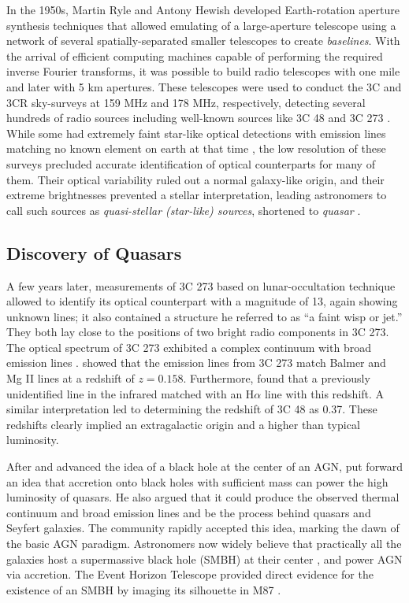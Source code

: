 In the 1950s, Martin Ryle and Antony Hewish developed Earth-rotation aperture synthesis techniques that allowed emulating of a large-aperture telescope using a network of several spatially-separated smaller telescopes to create \textit{baselines}. With the arrival of efficient computing machines capable of performing the required inverse Fourier transforms, it was possible to build radio telescopes with one mile and later with 5 km apertures. These telescopes 
were used to conduct the 3C and 3CR sky-surveys at 159 MHz and 178 MHz, respectively, detecting several hundreds of radio sources including well-known sources like 3C 48 and 3C 273 \citep{1959MmRAS..68...37E,10.1093/mnras/125.1.75}. While some had extremely faint star-like optical detections with emission lines matching no known element on earth at that time \citep{1963ApJ...138...30M}, the low resolution of these surveys precluded accurate identification of optical counterparts for many of them. Their optical variability ruled out a normal galaxy-like origin, and their extreme brightnesses prevented a stellar interpretation, leading astronomers to call such sources as \textit{quasi-stellar (star-like) sources}, shortened to \textit{quasar} \citep{chiu1964gravitational}. 

\subsection{Discovery of Quasars}
A few years later, measurements of 3C 273 based on lunar-occultation technique allowed  \citet{schmidt19633c} to identify its optical counterpart with a magnitude of 13, again showing unknown lines; it also contained a structure he referred to as ``a faint wisp or jet.'' They both lay close to the positions of two bright radio components in 3C 273. The optical spectrum of  3C 273 exhibited a complex continuum with broad emission lines \citep{oke1963absolute}.
\citet{schmidt19633c} showed that the emission lines from 3C 273 match Balmer and Mg II lines at a redshift of $z=0.158$. Furthermore, \citep{oke1963absolute} found that a previously unidentified line in the infrared matched with an H$\alpha$ line with this redshift. A similar interpretation led to determining the redshift of 3C 48 as 0.37. These redshifts clearly implied an extragalactic origin and a higher than typical luminosity. 

After \citet{salpeter1964accretion} and \citet{zel1964estimating} advanced the idea of a black hole at the center of an AGN, \citet{lynden1969galactic} put forward an idea that accretion onto black holes with sufficient mass can power the high luminosity of quasars. He also argued that it could produce the observed thermal continuum and broad emission lines and be the process behind quasars and Seyfert galaxies. The community rapidly accepted this idea, marking the dawn of the basic AGN paradigm. Astronomers now widely believe that practically all the galaxies host a supermassive black hole (SMBH) at their center \citep[e.g.,][]{richstone1998supermassive}, and power AGN via accretion. The Event Horizon Telescope provided direct evidence for the existence of an SMBH by imaging its silhouette in M87 \citep{2019ApJ...875L...1E}.

